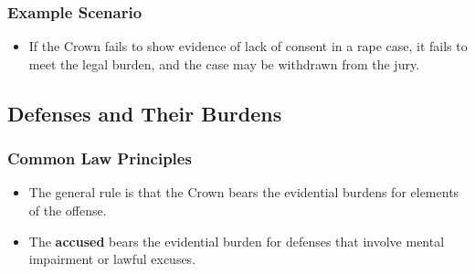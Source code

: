 \subsubsection{Example Scenario}\label{example-scenario}

\begin{itemize}
\tightlist
\item
  If the Crown fails to show evidence of lack of consent in a rape case,
  it fails to meet the legal burden, and the case may be withdrawn from
  the jury.
\end{itemize}

\subsection{ Defenses and Their
Burdens}\label{defenses-and-their-burdens}

\subsubsection{Common Law Principles}\label{common-law-principles}

\begin{itemize}
\tightlist
\item
  The general rule is that the Crown bears the evidential burdens for
  elements of the offense.
\item
  The \textbf{accused} bears the evidential burden for defenses that
  involve mental impairment or lawful excuses.
\end{itemize}

